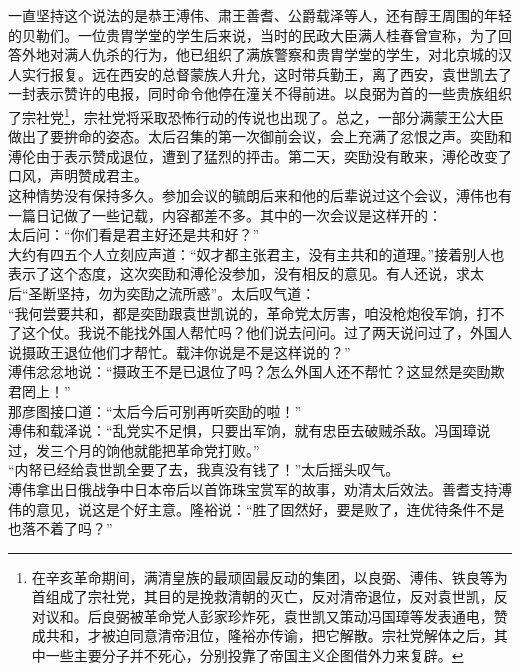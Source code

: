 一直坚持这个说法的是恭王溥伟、肃王善耆、公爵载泽等人，还有醇王周围的年轻的贝勒们。一位贵胄学堂的学生后来说，当时的民政大臣满人桂春曾宣称，为了回答外地对满人仇杀的行为，他已组织了满族警察和贵胄学堂的学生，对北京城的汉人实行报复。远在西安的总督蒙族人升允，这时带兵勤王，离了西安，袁世凯去了一封表示赞许的电报，同时命令他停在潼关不得前进。以良弼为首的一些贵族组织了宗社党\footnote{在辛亥革命期间，满清皇族的最顽固最反动的集团，以良弼、溥伟、铁良等为首组成了宗社党，其目的是挽救清朝的灭亡，反对清帝退位，反对袁世凯，反对议和。后良弼被革命党人彭家珍炸死，袁世凯又策动冯国璋等发表通电，赞成共和，才被迫同意清帝沮位，隆裕亦传谕，把它解散。宗社党解体之后，其中一些主要分子并不死心，分别投靠了帝国主义企图借外力来复辟。}，宗社党将采取恐怖行动的传说也出现了。总之，一部分满蒙王公大臣做出了要拚命的姿态。太后召集的第一次御前会议，会上充满了忿恨之声。奕劻和溥伦由于表示赞成退位，遭到了猛烈的抨击。第二天，奕劻没有敢来，溥伦改变了口风，声明赞成君主。\\

这种情势没有保持多久。参加会议的毓朗后来和他的后辈说过这个会议，溥伟也有一篇日记做了一些记载，内容都差不多。其中的一次会议是这样开的：\\

太后问：“你们看是君主好还是共和好？”\\

大约有四五个人立刻应声道：“奴才都主张君主，没有主共和的道理。”接着别人也表示了这个态度，这次奕劻和溥伦没参加，没有相反的意见。有人还说，求太后“圣断坚持，勿为奕劻之流所惑”。太后叹气道：\\

“我何尝要共和，都是奕劻跟袁世凯说的，革命党太厉害，咱没枪炮役军饷，打不了这个仗。我说不能找外国人帮忙吗？他们说去问问。过了两天说问过了，外国人说摄政王退位他们才帮忙。载沣你说是不是这样说的？”\\

溥伟忿忿地说：“摄政王不是已退位了吗？怎么外国人还不帮忙？这显然是奕劻欺君罔上！”\\

那彦图接口道：“太后今后可别再听奕劻的啦！”\\

溥伟和载泽说：“乱党实不足惧，只要出军饷，就有忠臣去破贼杀敌。冯国璋说过，发三个月的饷他就能把革命党打败。”\\

“内帑已经给袁世凯全要了去，我真没有钱了！”太后摇头叹气。\\

溥伟拿出日俄战争中日本帝后以首饰珠宝赏军的故事，劝清太后效法。善耆支持溥伟的意见，说这是个好主意。隆裕说：“胜了固然好，要是败了，连优待条件不是也落不着了吗？”\\

